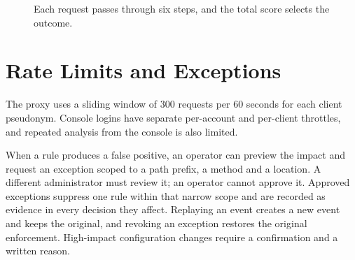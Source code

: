\documentclass{FastFyp}
\begin{document}
\begin{figure}[!h]
\centering
{}
\caption{Each request passes through six steps, and the total score selects the outcome.}
\label{fig:pipeline}
\end{figure}

\section{Rate Limits and Exceptions}
The proxy uses a sliding window of 300 requests per 60 seconds for each client pseudonym. Console logins have separate per-account and per-client throttles, and repeated analysis from the console is also limited.

When a rule produces a false positive, an operator can preview the impact and request an exception scoped to a path prefix, a method and a location. A different administrator must review it; an operator cannot approve it. Approved exceptions suppress one rule within that narrow scope and are recorded as evidence in every decision they affect. Replaying an event creates a new event and keeps the original, and revoking an exception restores the original enforcement. High-impact configuration changes require a confirmation and a written reason.
\end{document}

